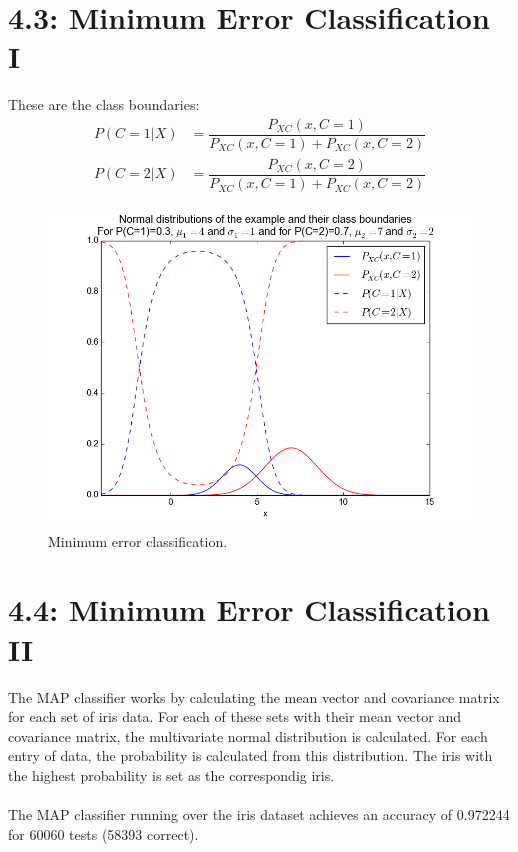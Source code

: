 \documentclass[a4paper,12px]{article}
\begin{document}
\section{4.3: Minimum Error Classification I}
These are the class boundaries:
\begin{equation}
    \begin{aligned}
        P(C=1|X) &= \dfrac{P_{XC}(x,C=1)}{P_{XC}(x,C=1)+ P_{XC}(x,C=2)}\\
        P(C=2|X) &= \dfrac{P_{XC}(x,C=2)}{P_{XC}(x,C=1)+ P_{XC}(x,C=2)}
    \end{aligned}
\end{equation}
\begin{figure}[h!]
    \centering
    \includegraphics[width=1\textwidth]{min_err_class.png}
    \caption{Minimum error classification.}
    \label{fig:knnb_example}
\end{figure}
\FloatBarrier

\section{4.4: Minimum Error Classification II}
The MAP classifier works by calculating the mean vector and covariance matrix for
 each set of iris data. For each of these sets with their mean vector and covariance
 matrix, the multivariate normal distribution is calculated. For each entry of data, the probability
 is calculated from this distribution. The iris with the highest probability is
 set as the correspondig iris. \\\\
The MAP classifier running over the iris dataset achieves an accuracy of 0.972244 for 60060 tests (58393 correct).


% 
% 
\end{document}
